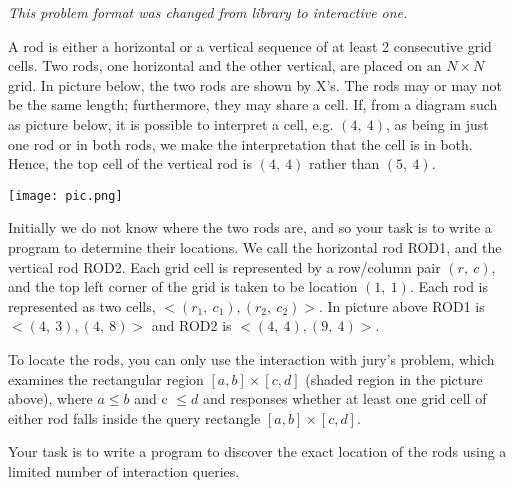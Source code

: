 {\it This problem format was changed from library to interactive one. }

A rod is either a horizontal or a vertical sequence of at least 2 consecutive grid cells.
Two rods, one horizontal and the other vertical, are placed on an $N \times N$ grid. In
picture below, the two rods are shown by X's. The rods may or may not be the same length;
furthermore, they may share a cell. If, from a diagram such as picture below, it is possible to interpret a cell, e.g. $(4,~4)$, as being in just one rod or in both rods, we make the interpretation that the cell is in both. Hence, the top cell of the vertical rod is $(4,~4)$ rather than $(5,~4)$.

\texttt{[image: pic.png]}


Initially we do not know where the two rods are, and so your task is to write a program
to determine their locations. We call the horizontal rod ROD1, and the vertical rod
ROD2. Each grid cell is represented by a row/column pair $(r,~c)$, and the top left corner
of the grid is taken to be location $(1,~1)$. Each rod is represented as two cells, $<(r_1,~c_1), (r_2,~c_2)>$. In picture above ROD1 is $<(4,~3), (4,~8)>$ and ROD2 is $<(4,~4), (9,~4)>$.

To locate the rods, you can only use the interaction with jury's problem, which examines the rectangular region $[a,b]\times[c,d]$ (shaded region in the picture above), where $a \le b$ and c $\le d$ and responses whether at least one grid cell of either rod falls inside the query rectangle $[a,b]\times[c,d]$.

Your task is to write a program to discover the exact location of the rods using a limited number of interaction queries.